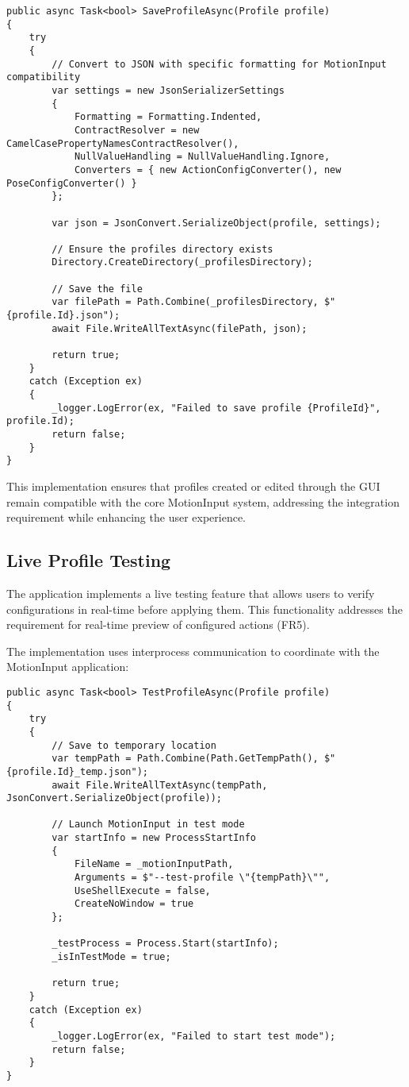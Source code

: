 \begin{verbatim}
public async Task<bool> SaveProfileAsync(Profile profile)
{
    try
    {
        // Convert to JSON with specific formatting for MotionInput compatibility
        var settings = new JsonSerializerSettings
        {
            Formatting = Formatting.Indented,
            ContractResolver = new CamelCasePropertyNamesContractResolver(),
            NullValueHandling = NullValueHandling.Ignore,
            Converters = { new ActionConfigConverter(), new PoseConfigConverter() }
        };
        
        var json = JsonConvert.SerializeObject(profile, settings);
        
        // Ensure the profiles directory exists
        Directory.CreateDirectory(_profilesDirectory);
        
        // Save the file
        var filePath = Path.Combine(_profilesDirectory, $"{profile.Id}.json");
        await File.WriteAllTextAsync(filePath, json);
        
        return true;
    }
    catch (Exception ex)
    {
        _logger.LogError(ex, "Failed to save profile {ProfileId}", profile.Id);
        return false;
    }
}
\end{verbatim}

This implementation ensures that profiles created or edited through the GUI remain compatible with the core MotionInput system, addressing the integration requirement while enhancing the user experience.

\subsection{Live Profile Testing}
The application implements a live testing feature that allows users to verify configurations in real-time before applying them. This functionality addresses the requirement for real-time preview of configured actions (FR5).

The implementation uses interprocess communication to coordinate with the MotionInput application:

\begin{verbatim}
public async Task<bool> TestProfileAsync(Profile profile)
{
    try
    {
        // Save to temporary location
        var tempPath = Path.Combine(Path.GetTempPath(), $"{profile.Id}_temp.json");
        await File.WriteAllTextAsync(tempPath, JsonConvert.SerializeObject(profile));
        
        // Launch MotionInput in test mode
        var startInfo = new ProcessStartInfo
        {
            FileName = _motionInputPath,
            Arguments = $"--test-profile \"{tempPath}\"",
            UseShellExecute = false,
            CreateNoWindow = true
        };
        
        _testProcess = Process.Start(startInfo);
        _isInTestMode = true;
        
        return true;
    }
    catch (Exception ex)
    {
        _logger.LogError(ex, "Failed to start test mode");
        return false;
    }
}
\end{verbatim}

